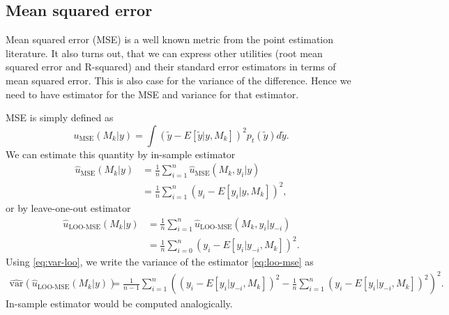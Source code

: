 \documentclass{article}
\begin{document}
\subsection{Mean squared error}
Mean squared error (MSE) is a well known metric from the point estimation literature. It also turns out, that we can express other utilities (root mean squared error and R-squared) and their standard error estimators in terms of mean squared error. This is also case for the variance of the difference. Hence we need to have estimator for the MSE and variance for that estimator.

MSE is simply defined as
\begin{equation}
    u_{\text{MSE}}(M_k | y) = \int \left( \tilde{y} - E\left[ \tilde{y} | y, M_k \right] \right)^2 p_t(\tilde{y}) d\tilde{y}.
\end{equation}
We can estimate this quantity by in-sample estimator
\begin{align}
    \hat{u}_{\text{MSE}}(M_k | y) &= \frac{1}{n} \sum_{i=1}^n \hat{u}_{\text{MSE}}(M_k, y_i | y) \nonumber \\ 
    &= \frac{1}{n} \sum_{i=1}^n \left( y_i - E\left[ y_i | y, M_k \right] \right)^2,
\end{align}
or by leave-one-out estimator
\begin{align}
    \hat{u}_{\text{LOO-MSE}}(M_k | y) &=\frac{1}{n} \sum_{i=1}^n \hat{u}_{\text{LOO-MSE}}(M_k, y_i | y_{-i}) \nonumber \\
    &=\frac{1}{n} \sum_{i=0}^n \left( y_i - E\left[ y_i | y_{-i}, M_k \right] \right)^2. \label{eq:loo-mse}
\end{align}
Using \eqref{eq:var-loo}, we write the variance of the estimator \eqref{eq:loo-mse} as
\begin{align}
    \widehat{\text{var}}\left( \hat{u}_{\text{LOO-MSE}}(M_k | y) \right) &= \frac{1}{n-1} \sum_{i = 1}^n \left( \left( y_i - E[y_i | y_{-i}, M_k]\right)^2 -  \frac{1}{n} \sum_{i=1}^n \left( y_i - E[y_i | y_{-i}, M_k]\right)^2 \right)^2 \label{eq:var-loo-mse}.
\end{align}
In-sample estimator would be computed analogically. 

\end{document}
